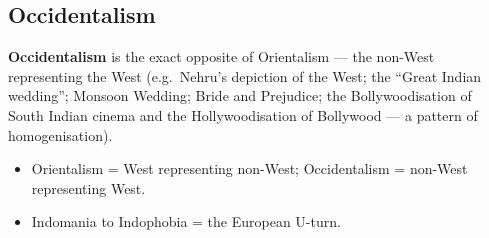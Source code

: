 \subsection{Occidentalism}

\begin{KeyConcept}
\textbf{Occidentalism} is the exact opposite of Orientalism --- the non-West representing the West (e.g.\ Nehru's depiction of the West; the ``Great Indian wedding''; Monsoon Wedding; Bride and Prejudice; the Bollywoodisation of South Indian cinema and the Hollywoodisation of Bollywood --- a pattern of homogenisation).
\end{KeyConcept}

\begin{QuickRevision}
\begin{itemize}
\item Orientalism = West representing non-West; Occidentalism = non-West representing West.
\item Indomania to Indophobia = the European U-turn.
\end{itemize}
\end{QuickRevision}
